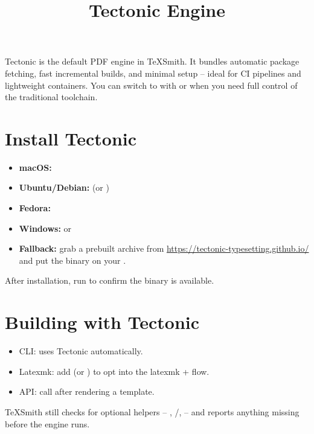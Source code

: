 \documentclass[a4paper,twoside]{article}
\title{Tectonic Engine}
\author{}\date{}
\begin{document}
\maketitle
Tectonic is the default PDF engine in TeXSmith. It bundles automatic package
fetching, fast incremental builds, and minimal setup -- ideal for CI pipelines and
lightweight containers. You can switch to  with  or
 when you need full control of the traditional toolchain.
\section{Install Tectonic}
\begin{itemize}
\item \textbf{macOS:} 
\item \textbf{Ubuntu/Debian:}  (or )
\item \textbf{Fedora:} 
\item \textbf{Windows:}  or 
\item \textbf{Fallback:} grab a prebuilt archive from \url{https://tectonic-typesetting.github.io/} and put
the  binary on your .
\end{itemize}
After installation, run  to confirm the binary is available.
\section{Building with Tectonic}
\begin{itemize}
\item CLI:  uses Tectonic automatically.
\item Latexmk: add  (or ) to opt into the latexmk +
 flow.
\item API: call  after
rendering a template.
\end{itemize}
TeXSmith still checks for optional helpers -- , /,
 -- and reports anything missing before the engine runs.
\end{document}
